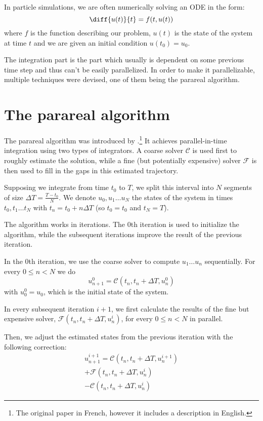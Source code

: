 \documentclass[conference]{IEEEtran}
\begin{document}
In particle simulations, we are often numerically solving an ODE in the form:
$$
\diff{u(t)}{t} = f(t, u(t))
$$
where $f$ is the function describing our problem, $u(t)$ is the state of the system at time $t$ and we are given an initial condition $u(t_0) = u_0$.

The integration part is the part which usually is dependent on some previous time step and thus can't be easily parallelized. In order to make it parallelizable, multiple techniques were devised, one of them being the parareal algorithm.

\section{The parareal algorithm}

The parareal algorithm was introduced by \cite{parareal}.\footnote{The original paper in French, however it includes a description in English.} It achieves parallel-in-time integration using two types of integrators. A coarse solver $\mathcal{C}$ is used first to roughly estimate the solution, while a fine (but potentially expensive) solver $\mathcal{F}$ is then used to fill in the gaps in this estimated trajectory.

Supposing we integrate from time $t_0$ to $T$, we split this interval into $N$ segments of size $\Delta T = \frac{T-t_0}{N}$. We denote $u_0, u_1\dots u_N$ the states of the system in times $t_0, t_1\dots t_N$ with $t_n = t_0 + n\Delta T$ (so $t_0 = t_0$ and $t_N = T$).

The algorithm works in iterations. The 0th iteration is used to initialize the algorithm, while the subsequent iterations improve the result of the previous iteration.

In the 0th iteration, we use the coarse solver to compute $u_1\dots u_n$ sequentially. For every $0 \leq n < N$ we do
$$
u^0_{n+1} = \mathcal{C}(t_n, t_n+\Delta T, u^0_n)
$$
with $u^0_0 = u_0$, which is the initial state of the system.

In every subsequent iteration $i+1$, we first calculate the results of the fine but expensive solver, $\mathcal{F}(t_n, t_n+\Delta T, u^{i}_n)$, for every $0 \leq n < N$ in parallel.

Then, we adjust the estimated states from the previous iteration with the following correction:
\begin{multline}
u^{i+1}_{n+1} = \mathcal{C}(t_n, t_n+\Delta T, u^{i+1}_n)\\ + \mathcal{F}(t_n, t_n+\Delta T, u^i_n)\\ - \mathcal{C}(t_n, t_n+\Delta T, u^{i}_n)
\end{multline}
\end{document}
